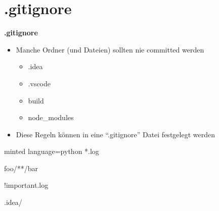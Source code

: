 \section{.gitignore}\label{sec:.gitignore}

\begin{frame}[b]
    \begin{center}
        
    \end{center}
    \vfill
    \begin{flushleft}
        \Huge
        \textbf{.gitignore}
    \end{flushleft}
\end{frame}

\begin{frame}
    \slidehead
    \begin{itemize}[<+->]
        \item Manche Ordner (und Dateien) sollten nie committed werden
        \begin{itemize}
            \item .idea
            \item .vscode
            \item build
            \item node\_modules
        \end{itemize}
        \item Diese Regeln können in eine \enquote{.gitignore} Datei festgelegt werden
    \end{itemize}
\end{frame}

\begin{frame}[fragile]
    \slidehead
    \begin{codeBlock}[]{minted language=python}
        *.log

        foo/**/bar

        !important.log

        .idea/
    \end{codeBlock}
    \renewcommand{\thefootnote}{\relax}
\end{frame}

